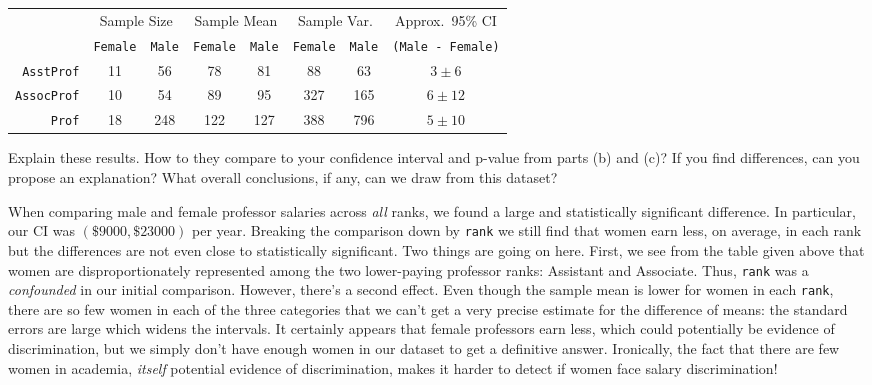 \documentclass[addpoints,12pt]{exam}
\begin{document}
\begin{questions}
\begin{parts}
\vspace{1em}
\begin{tabular}
	 	{r|cc|cc|cc|c}
	 	&\multicolumn{2}{c|}{Sample Size} & \multicolumn{2}{c|}{Sample Mean} & \multicolumn{2}{c|}{Sample Var.}& Approx.\ 95\% CI\\
	 	& \texttt{Female} & \texttt{Male} & \texttt{Female} & \texttt{Male} & \texttt{Female} & \texttt{Male}&\texttt{(Male - Female)}\\
	 	\hline
	 	\texttt{AsstProf}&11&56		&78&81&88&63& $3\pm 6$\\
	 	\texttt{AssocProf}&10&54	&89&95&327&165& $6\pm  12$\\
	 	\texttt{Prof}&18&248		&122&127&388&796& $5\pm  10$
	 \end{tabular}

\vspace{1em}
	 Explain these results. How to they compare to your confidence interval and p-value from parts (b) and (c)? If you find differences, can you propose an explanation? What overall conclusions, if any, can we draw from this dataset?
	 \begin{solution}[15.5cm]
	 	When comparing male and female professor salaries across \emph{all} ranks, we found a large and statistically significant difference. In particular, our CI was $(\$9000, \$23000)$ per year. Breaking the comparison down by \texttt{rank} we still find that women earn less, on average, in each rank but the differences are not even close to statistically significant. Two things are going on here. First, we see from the table given above that women are disproportionately represented among the two lower-paying professor ranks: Assistant and Associate. Thus, \texttt{rank} was a \emph{confounded} in our initial comparison. However, there's a second effect. Even though the sample mean is lower for women in each \texttt{rank}, there are so few women in each of the three categories that we can't get a very precise estimate for the difference of means: the standard errors are large which widens the intervals. It certainly appears that female professors earn less, which could potentially be evidence of discrimination, but we simply don't have enough women in our dataset to get a definitive answer. Ironically, the fact that there are few women in academia, \emph{itself} potential evidence of discrimination, makes it harder to detect if women face salary discrimination!
	 \end{solution}
\end{parts}




\end{questions}
\end{document}
